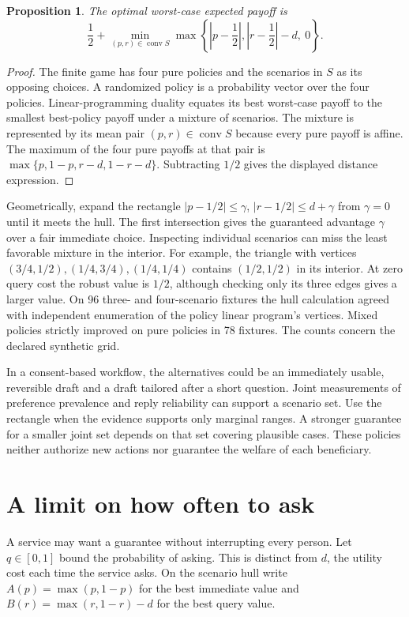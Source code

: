 \documentclass[11pt]{article}
\newtheorem{proposition}{Proposition}
\begin{document}
\begin{proposition}
The optimal worst-case expected payoff is
\[
\frac12+\min_{(p,r)\in\operatorname{conv}S}
  \max\left\{\left|p-\frac12\right|,
              \left|r-\frac12\right|-d,\ 0\right\}.
\]
\end{proposition}
\begin{proof}
The finite game has four pure policies and the scenarios in
$S$ as its opposing choices. A randomized policy is a probability
vector over the four policies. Linear-programming duality
equates its best worst-case payoff to the smallest best-policy
payoff under a mixture of scenarios. The mixture is represented
by its mean pair $(p,r)\in\operatorname{conv}S$ because every
pure payoff is affine. The maximum of the four pure payoffs
at that pair is
$\max\{p,1-p,r-d,1-r-d\}$. Subtracting $1/2$ gives the
displayed distance expression.
\end{proof}

Geometrically, expand the rectangle
$|p-1/2|\le\gamma$, $|r-1/2|\le d+\gamma$
from $\gamma=0$ until it meets the hull. The first intersection
gives the guaranteed advantage $\gamma$ over a fair immediate
choice. Inspecting individual scenarios can miss the least
favorable mixture in the interior. For example, the triangle
with vertices $(3/4,1/2),(1/4,3/4),(1/4,1/4)$ contains
$(1/2,1/2)$ in its interior. At zero query cost the robust
value is $1/2$, although checking only its three edges gives
a larger value. On 96 three- and four-scenario fixtures the
hull calculation agreed with independent enumeration of the
policy linear program's vertices. Mixed policies strictly
improved on pure policies in 78 fixtures. The counts concern
the declared synthetic grid.

In a consent-based workflow, the alternatives could be an
immediately usable, reversible draft and a draft tailored after a
short question. Joint measurements of preference prevalence and
reply reliability can support a scenario set. Use the rectangle
when the evidence supports only marginal ranges. A stronger
guarantee for a smaller joint set depends on that set covering
plausible cases. These policies neither authorize new actions nor
guarantee the welfare of each beneficiary.

\section{A limit on how often to ask}
A service may want a guarantee without interrupting every person.
Let $q\in[0,1]$ bound the probability of asking. This is distinct
from $d$, the utility cost each time the service asks. On the
scenario hull write $A(p)=\max(p,1-p)$ for the best immediate
value and $B(r)=\max(r,1-r)-d$ for the best query value.
\end{document}
